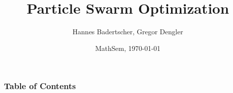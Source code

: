 \documentclass{beamer}
\title{Particle Swarm Optimization}
\author[Badertscher, Dengler]{Hannes Badertscher, Gregor Dengler}
\date [MathSem, FS13]{MathSem, \today}
\begin{document}
	\begin{frame}
		\titlepage
	\end{frame}

	\begin{frame}
		\frametitle{Table of Contents}
		\tableofcontents[currentsection]
	\end{frame}
  
	
	
	
	
	
\end{document}
